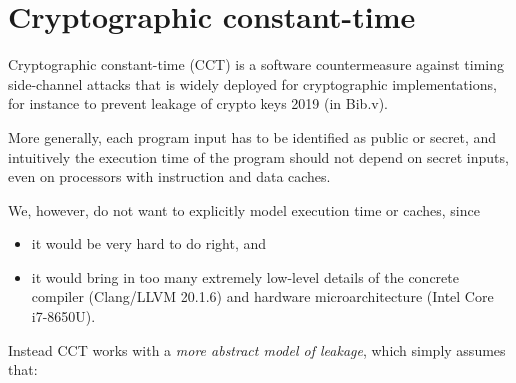 \documentclass[12pt]{report}
\begin{document}
\section{Cryptographic constant-time}



 Cryptographic constant-time (CCT) is a software countermeasure against
    timing side-channel attacks that is widely deployed for cryptographic
    implementations, for instance to prevent leakage of crypto keys
       2019 (in Bib.v).


    More generally, each program input has to be identified as public or secret,
    and intuitively the execution time of the program should not depend on
    secret inputs, even on processors with instruction and data caches.


    We, however, do not want to explicitly model execution time or caches, since

\begin{itemize}
\item  it would be very hard to do right, and

\item  it would bring in too many extremely low-level details of the concrete compiler
      (Clang/LLVM 20.1.6) and hardware microarchitecture (Intel Core i7-8650U). 
\end{itemize}


 Instead CCT works with a \textit{more abstract model of leakage},
    which simply assumes that:
\end{document}
